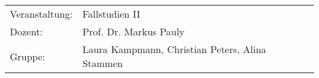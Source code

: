 \begin{titlepage}

    \maketitle

	\vfill

    \begin{tabular}{ll}
      Veranstaltung: & Fallstudien II \\
      Dozent: & Prof. Dr. Markus Pauly \\
      Gruppe: & Laura Kampmann, Christian Peters, Alina Stammen \\
    \end{tabular}
    
\thispagestyle{empty}
\end{titlepage}